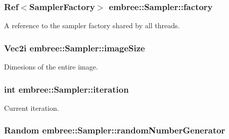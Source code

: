 \hypertarget{classembree_1_1_sampler_a66d739c6b33ea75337cf3fb96c2b3cf5}{
\subsubsection[{factory}]{\setlength{\rightskip}{0pt plus 5cm}Ref$<${\bf SamplerFactory}$>$ {\bf embree::Sampler::factory}}}
\label{classembree_1_1_sampler_a66d739c6b33ea75337cf3fb96c2b3cf5}


A reference to the sampler factory shared by all threads. 

\hypertarget{classembree_1_1_sampler_ab87a1a43193c03831de1c238b426531d}{
\subsubsection[{imageSize}]{\setlength{\rightskip}{0pt plus 5cm}Vec2i {\bf embree::Sampler::imageSize}}}
\label{classembree_1_1_sampler_ab87a1a43193c03831de1c238b426531d}


Dimesions of the entire image. 

\hypertarget{classembree_1_1_sampler_af6a3139e4ac5ef9e34b3e86c15164fb8}{
\subsubsection[{iteration}]{\setlength{\rightskip}{0pt plus 5cm}int {\bf embree::Sampler::iteration}}}
\label{classembree_1_1_sampler_af6a3139e4ac5ef9e34b3e86c15164fb8}


Current iteration. 

\hypertarget{classembree_1_1_sampler_ac12f4b87473624b4927fbf8a0aa5c63f}{
\subsubsection[{randomNumberGenerator}]{\setlength{\rightskip}{0pt plus 5cm}Random {\bf embree::Sampler::randomNumberGenerator}}}
\label{classembree_1_1_sampler_ac12f4b87473624b4927fbf8a0aa5c63f}


